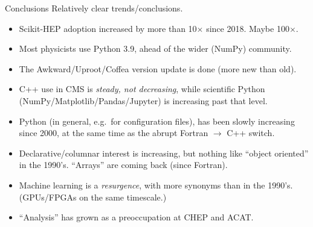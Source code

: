 \documentclass[aspectratio=169]{beamer}
\begin{document}
\begin{frame}{Conclusions}
\Large
\vspace{0.25 cm}
Relatively clear trends/conclusions.

\vspace{0.2 cm}
\begin{itemize}\setlength{\itemsep}{0.12 cm}\large
\item Scikit-HEP adoption increased by more than 10$\times$ since 2018. Maybe 100$\times$.
\item Most physicists use Python 3.9, ahead of the wider (NumPy) community.
\item The Awkward/Uproot/Coffea version update is done (more new than old).
\item C++ use in CMS is {\it steady, not decreasing}, while scientific Python (NumPy/Matplotlib/Pandas/Jupyter) is increasing past that level.
\item Python (in general, e.g.\ for configuration files), has been slowly increasing since 2000, at the same time as the abrupt Fortran $\to$ C++ switch.
\item Declarative/columnar interest is increasing, but nothing like ``object oriented'' in the 1990's. ``Arrays'' are coming back (since Fortran).
\item Machine learning is a {\it resurgence}, with more synonyms than in the 1990's. (GPUs/FPGAs on the same timescale.)
\item ``Analysis'' has grown as a preoccupation at CHEP and ACAT.
\end{itemize}
\end{frame}
\end{document}
